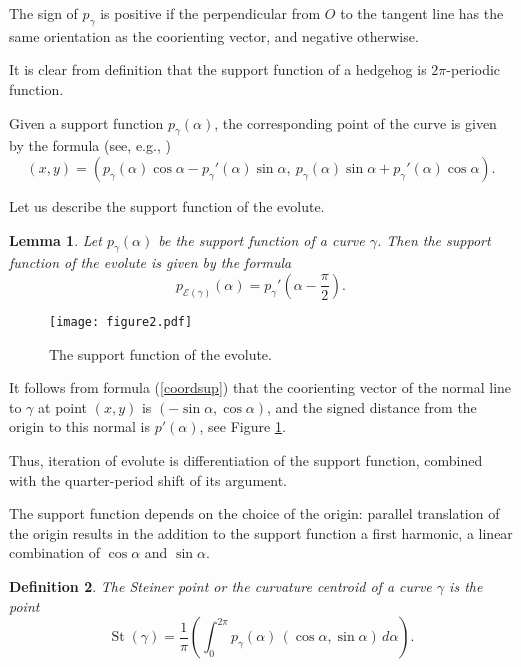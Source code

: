 \documentclass[12pt]{article}
\makeatletter
\newtheorem{lemma}{Lemma}[section]
\newtheorem{definition}[lemma]{Definition}
\renewenvironment{proof}[1][\proofname] 
{\par\pushQED{\qed}\normalfont\topsep6\p@\@plus6\p@\relax\trivlist\item[\hskip\labelsep\bfseries#1\@addpunct{.}]\ignorespaces}{\popQED\endtrivlist\@endpefalse}
\newcommand{\E}{\mathcal{E}}
\newcommand{\g}{{\gamma}}
\newcommand{\St}{\operatorname{St}}
\makeatother
\begin{document}
The sign of $p_\g$ is positive if the perpendicular from $O$ to the tangent line has the same orientation as the coorienting vector, and negative otherwise. 

It is clear from definition that the support function of a hedgehog is $2\pi$-periodic function. 

Given a support function $p_\g(\alpha)$, the corresponding point of the curve is given by the formula (see, e.g., \cite{Sch})
\begin{equation}
\label{coordsup}
(x,y)=(p_\g(\alpha) \cos \alpha - p_\g'(\alpha) \sin \alpha,\  p_\g(\alpha) \sin \alpha + p_\g'(\alpha) \cos \alpha).
\end{equation}

Let us describe the support function of the evolute.  

\begin{lemma}
\label{evolsupp}
Let $p_\g(\alpha)$ be the support function of a curve $\g$. Then the support function of the evolute  is given by the formula $$p_{\E(\g)}(\alpha) = p_\g'\left(\alpha-\frac{\pi}{2}\right).$$
\end{lemma}

\begin{figure}[hbtp]
\centering
\texttt{[image: figure2.pdf]}
\caption{The support function of the evolute.}
\label{support}
\end{figure}

\begin{proof}
It follows from formula (\ref{coordsup}) that the coorienting vector of the normal line to $\g$ at point $(x,y)$ is $(-\sin\alpha,\cos\alpha)$, and the signed distance from the origin to this normal  is $p'(\alpha)$, see Figure \ref{support}.
\end{proof}

Thus, iteration of evolute is differentiation of the support function, combined with the quarter-period shift of its argument.

The support function depends on the choice of the origin: parallel translation of the origin results in the addition to the support function a first harmonic, a linear combination of $\cos \alpha$ and $\sin \alpha$.

\begin{definition}
\label{Steiner} 
The \emph{Steiner point}  or the \emph{curvature centroid} of a curve $\g$ is the point
\begin{equation}
\label{Stptform}
\St(\g)=\frac{1}{\pi} \left(\int_0^{2\pi} p_\g(\alpha)\, (\cos \alpha,\sin\alpha)\, d\alpha\right).
\end{equation}
\end{definition}
\end{document}
